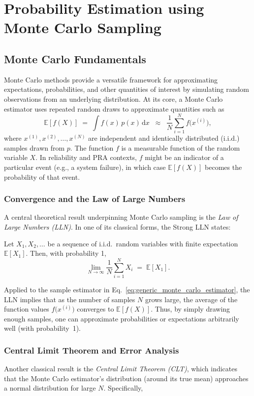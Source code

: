 \chapter{Probability Estimation using Monte Carlo Sampling}
\section{Monte Carlo Fundamentals}
Monte Carlo methods provide a versatile framework for approximating expectations, probabilities, and other quantities of interest by simulating random observations from an underlying distribution. At its core, a Monte Carlo estimator uses repeated random draws to approximate quantities such as
\begin{equation}
\label{eq:generic_monte_carlo_estimator}
\mathbb{E}[f(X)]
\;=\;
\int f(x)\,p(x)\,\mathrm{d}x
\;\;\approx\;\;
\frac{1}{N}\sum_{i=1}^N f\bigl(x^{(i)}\bigr),
\end{equation}
where \(x^{(1)},x^{(2)},\dots,x^{(N)}\) are independent and identically distributed (i.i.d.) samples drawn from \(p\). The function \(f\) is a measurable function of the random variable \(X\). In reliability and PRA contexts, \(f\) might be an indicator of a particular event (e.g., a system failure), in which case \(\mathbb{E}[f(X)]\) becomes the probability of that event.
\subsection{Convergence and the Law of Large Numbers}
A central theoretical result underpinning Monte Carlo sampling is the \emph{Law of Large Numbers (LLN)}. In one of its classical forms, the Strong LLN states:
\begin{theorem}
\label{thm:SLLN}
Let \(X_1, X_2, \dots\) be a sequence of i.i.d.\ random variables with finite expectation \(\mathbb{E}[X_1]\). Then, with probability 1,
\[
\lim_{N\to\infty}
\frac{1}{N}\sum_{i=1}^N X_i
\;=\;
\mathbb{E}[X_1].
\]
\end{theorem}
Applied to the sample estimator in Eq.~\eqref{eq:generic_monte_carlo_estimator}, the LLN implies that as the number of samples \(N\) grows large, the average of the function values \(f\bigl(x^{(i)}\bigr)\) converges to \(\mathbb{E}[f(X)]\). Thus, by simply drawing enough samples, one can approximate probabilities or expectations arbitrarily well (with probability~1).

\subsection{Central Limit Theorem and Error Analysis}
Another classical result is the \emph{Central Limit Theorem (CLT)}, which indicates that the Monte Carlo estimator’s distribution (around its true mean) approaches a normal distribution for large \(N\). Specifically,

